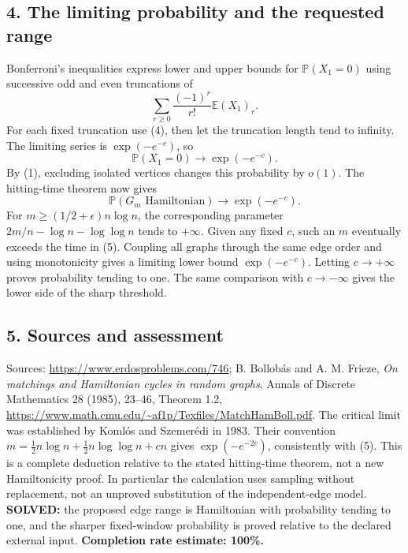 \subsection*{4. The limiting probability and the requested range}
Bonferroni's inequalities express lower and upper bounds for $\mathbb P(X_1=0)$ using successive odd and even truncations of
\[
 \sum_{r\ge0}\frac{(-1)^r}{r!}\mathbb E(X_1)_r.
\]
For each fixed truncation use (4), then let the truncation length tend to infinity. The limiting series is $\exp(-e^{-c})$, so
\[
 \mathbb P(X_1=0)\longrightarrow\exp(-e^{-c}).
\]
By (1), excluding isolated vertices changes this probability by $o(1)$. The hitting-time theorem now gives
\[
 \mathbb P(G_m\text{ Hamiltonian})\longrightarrow\exp(-e^{-c}). \tag{5}
\]
For $m\ge(1/2+\epsilon)n\log n$, the corresponding parameter $2m/n-\log n-\log\log n$ tends to $+\infty$. Given any fixed $c$, such an $m$ eventually exceeds the time in (5). Coupling all graphs through the same edge order and using monotonicity gives a limiting lower bound $\exp(-e^{-c})$. Letting $c\to+\infty$ proves probability tending to one. The same comparison with $c\to-\infty$ gives the lower side of the sharp threshold.
\subsection*{5. Sources and assessment}
Sources: \url{https://www.erdosproblems.com/746}; B. Bollob\'as and A. M. Frieze, \emph{On matchings and Hamiltonian cycles in random graphs}, Annals of Discrete Mathematics 28 (1985), 23--46, Theorem 1.2, \url{https://www.math.cmu.edu/~af1p/Texfiles/MatchHamBoll.pdf}. The critical limit was established by Koml\'os and Szemer\'edi in 1983. Their convention $m=\tfrac12n\log n+\tfrac12n\log\log n+cn$ gives $\exp(-e^{-2c})$, consistently with (5).
This is a complete deduction relative to the stated hitting-time theorem, not a new Hamiltonicity proof. In particular the calculation uses sampling without replacement, not an unproved substitution of the independent-edge model.
\textbf{SOLVED:} the proposed edge range is Hamiltonian with probability tending to one, and the sharper fixed-window probability is proved relative to the declared external input.
\textbf{Completion rate estimate: 100\%.}
